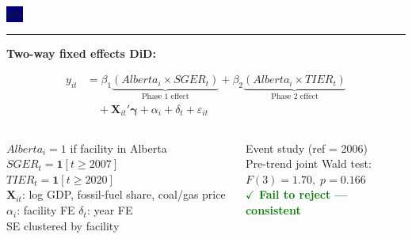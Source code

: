 \documentclass[aspectratio=169,12pt]{beamer}
\newcommand{\badge}[2][Navy]{%
  \colorbox{#1}{\color{white}\,\textbf{\small #2}\,}%
}
\newcommand{\grn}[1]{\textcolor{Green}{\textbf{#1}}}
\begin{document}
\begin{frame}
\badge{05}
\vspace{0.5em}\par
{\color{Blue}\rule{\linewidth}{0.8pt}}\par
\vspace{0.5em}

\textbf{Two-way fixed effects DiD:}

\begin{align*}
y_{it} &= \beta_1\!\underbrace{(Alberta_i \times SGER_t)}_{\text{Phase 1 effect}}
         + \beta_2\!\underbrace{(Alberta_i \times TIER_t)}_{\text{Phase 2 effect}}\\[4pt]
       &\quad + \mathbf{X}_{it}'\boldsymbol{\gamma}
         + \alpha_i + \delta_t + \varepsilon_{it}
\end{align*}

\vspace{0.3em}

\begin{columns}[T]
{\small
$Alberta_i = 1$ if facility in Alberta\\[2pt]
$SGER_t = \mathbf{1}[t \geq 2007]$ \quad $TIER_t = \mathbf{1}[t \geq 2020]$\\[2pt]
$\mathbf{X}_{it}$: log GDP, fossil-fuel share, coal/gas price\\[2pt]
$\alpha_i$: facility FE \quad $\delta_t$: year FE\\[2pt]
SE clustered by facility
}

\begin{tcolorbox}[statbox,title={\small Parallel trends test}]
Event study (ref = 2006)\\[3pt]
Pre-trend joint Wald test:\\
$F(3) = 1.70,\; p = 0.166$\\[3pt]
\grn{$\checkmark$ Fail to reject — consistent}
\end{tcolorbox}
\end{columns}
\end{frame}
\end{document}
